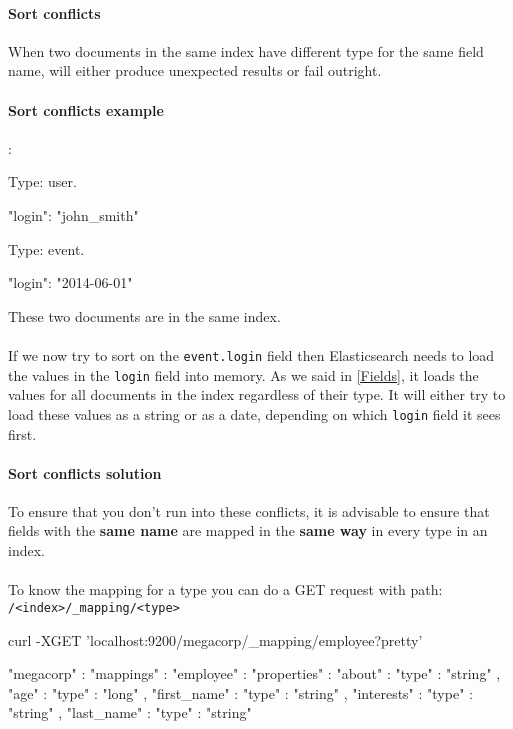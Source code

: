 \documentclass{article}%
\begin{document}
\paragraph{Sort conflicts} When two documents in the same index have different type for the same field name, will either produce unexpected results or fail outright.

\paragraph{Sort conflicts example}:

Type: user. 
\begin{command}
{ "login": "john_smith" }
\end{command}

Type: event. 
\begin{command}
{ "login": "2014-06-01" }
\end{command}
These two documents are in the same index.

\paragraph{} If we now try to sort on the \texttt{event.login} field then Elasticsearch needs to load the values in the \texttt{login} field into memory. As we said in \ref{Fields}, it loads the values for all documents in the index regardless of their type. It will either try to load these values as a string or as a date, depending on which \texttt{login} field it sees first.

\paragraph{Sort conflicts solution} To ensure that you don’t run into these conflicts, it is advisable to ensure that fields with the \textbf{same name} are mapped in the \textbf{same way} in every type in an index.

\paragraph{} To know the mapping for a type you can do a GET request with path: \texttt{/<index>/\_mapping/<type>}

\begin{command}
curl -XGET 'localhost:9200/megacorp/_mapping/employee?pretty'
\end{command}

\begin{command}
{
	"megacorp" : {
		"mappings" : {
			"employee" : {
				"properties" : {
					"about" : {
						"type" : "string"
					},
					"age" : {
						"type" : "long"
					},
					"first_name" : {
						"type" : "string"
					},
					"interests" : {
						"type" : "string"
					},
					"last_name" : {
						"type" : "string"
					}
				}
			}
		}
	}
}
\end{command}
\end{document}
